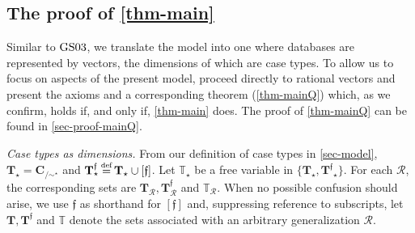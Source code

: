 \documentclass[ecta,nameyear,draft]{econsocart}
\newcommand{\reg}{\operatorname{reg}}
\newcommand{\countof}{\mathbin{\#}\hskip1pt}
\newcommand{\mc}{\mathcal}
\newcommand\defeq{\mathrel{\overset{\makebox[0pt]{\mbox{\normalfont\tiny def}}}{=}}}%
\newcommand{\novel}{\mathfrak f}
\newcommand{\preceqb}{\mathbin{\preceq}}
\newcommand{\ext}{\mathrel{\mc R}}
\newcommand{\supext}{{\ext}}
\newcommand{\mbbd}{{\mathbf D}}
\newcommand{\mbbc}{{\mathbf C}}
\newcommand{\mbbt}{{\mathbf {T}}}
\newcommand{\mbbtp}{{\mathbf{T}^\novel}}
\newcommand{\mbbtpp}{{\mathds{T}}}
\newcommand{\mbbi}{{\mathbf L}}
\newcommand{\mbbip}{{\mathbf{L}^{\novel}}}
\newcommand{\gsii}{$\textup{GS03}$}
\theoremstyle{plain}
\theoremstyle{remark}
\begin{document}
\makeatletter
\def\@seccntformat#1{Appendix\,\csname the#1\endcsname.\quad}
\makeatother
\begin{appendix}
  \section{The proof of \cref{thm-main}}\label{sec-proof-main}




  Similar to \gsii, we  translate the model into one where databases are
  represented by vectors, the dimensions of which are case types. To allow us
  to focus on aspects of the present model,  proceed directly to rational
  vectors and present the axioms  and a corresponding theorem
  (\cref{thm-mainQ}) which, as we confirm, holds if, and only if, 
  \cref{thm-main} does. The proof of \cref{thm-mainQ} can be found in
  \cref{sec-proof-mainQ}.


  \emph{Case types as dimensions.} From our definition of case types in 
  \cref{sec-model}, $\mbbt_\star = \mbbc_{/\sim^{\star}}$ and
  $\mbbt_\star^\novel \defeq \mbbt_\star\cup [ \novel ]$. Let $\mbbtpp_\star$
  be a free variable in $\{\mbbt_\star, \mbbtp_\star\}$.  For each $\ext$, the
  corresponding sets are $\mbbt_{\ext}, \mbbt_{\ext}^{\novel}$ and
  $\mbbtpp_{\ext}$. When no possible confusion should arise, we use $\novel$ as
  shorthand for $[\novel]$ and, suppressing reference to subscripts, let
  $\mbbt, \mbbtp$ and $\mbbtpp$ denote the sets associated with an arbitrary
  generalization $\ext$.



\end{appendix}
\end{document}
